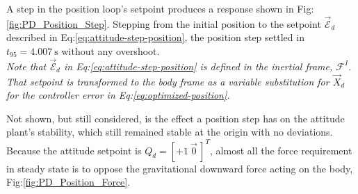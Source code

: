 A step in the position loop's setpoint produces a response shown in Fig:\ref{fig:PD_Position_Step}. Stepping from the initial position to the setpoint $\vec{\mathcal{E}}_d$ described in Eq:\ref{eq:attitude-step-position}, the position step settled in $t_{95}=4.007~\text{s}$ without any overshoot. 
\\
\emph{\color{Gray}Note that $\vec{\mathcal{E}}_d$ in Eq:\ref{eq:attitude-step-position} is defined in the inertial frame, $\mathcal{F}^{I}$. That setpoint is transformed to the body frame as a variable substitution for $\vec{X}_d$ for the controller error in Eq:\ref{eq:optimized-position}.}
\par
Not shown, but still considered, is the effect a position step has on the attitude plant's stability, which still remained stable at the origin with no deviations. Because the attitude setpoint is $Q_d=[+1~\vec{0}\hspace{2pt}]^T$, almost all the force requirement in steady state is to oppose the gravitational downward force acting on the body, Fig:\ref{fig:PD_Position_Force}.
